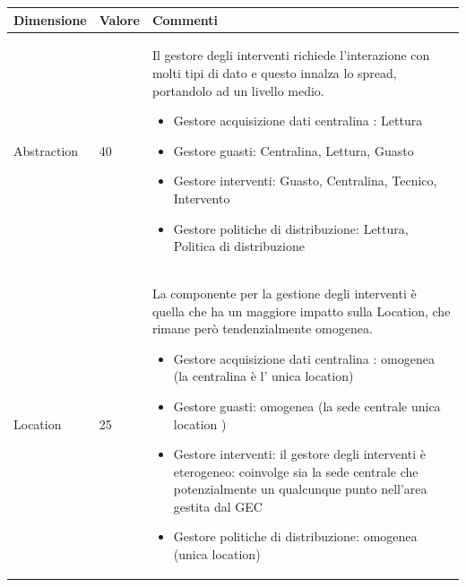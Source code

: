 \documentclass{beamer}
\begin{document}
\begin{frame}[allowframebreaks]
		\begin{center}
			\begin{table}
				\tiny
				\centering
				{\renewcommand{\arraystretch}{1.2}
					
					\begin{tabular}{|M{0.1\textwidth}|M{0.1\textwidth}|p{.6\textwidth}|}
						\hline
						Dimensione & Valore & Commenti \\
						\hline
						Abstraction & 40 & Il gestore degli interventi richiede l'interazione con molti tipi di dato e questo innalza lo spread, portandolo ad un livello medio.
						\begin{itemize}
							\item Gestore acquisizione dati centralina : Lettura
							\item Gestore guasti: Centralina, Lettura, Guasto
							\item Gestore interventi: Guasto, Centralina, Tecnico, Intervento
							\item Gestore politiche di distribuzione: Lettura, Politica di distribuzione
						\end{itemize} \\
						Location & 25 & La componente per la gestione degli interventi è quella che ha un maggiore impatto sulla Location, che rimane però tendenzialmente omogenea.
						\begin{itemize}
							\item Gestore acquisizione dati centralina : omogenea (la centralina è l' unica location)
							\item Gestore guasti:  omogenea (la sede centrale unica location )
							\item Gestore interventi: il gestore degli interventi è eterogeneo: coinvolge sia la sede centrale che potenzialmente un qualcunque punto nell'area gestita dal GEC
							\item Gestore politiche di distribuzione:  omogenea (unica location)
						\end{itemize} \\
						\hline
				\end{tabular}}
			\end{table}
		\end{center}	
	\end{frame}	
\end{document}
